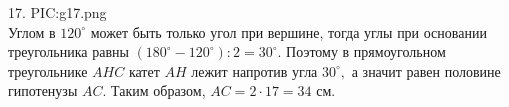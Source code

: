 17. {{PIC:g17.png}}\\
Углом в $120^\circ$ может быть только угол при вершине, тогда углы при основании треугольника равны $(180^\circ-120^\circ):2=30^\circ.$ Поэтому в прямоугольном треугольнике $AHC$ катет $AH$ лежит напротив угла $30^\circ,$ а значит равен половине гипотенузы $AC.$ Таким образом, $AC=2\cdot17=34$ см.\\
